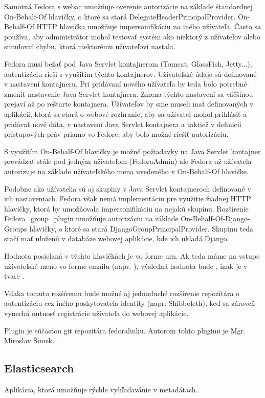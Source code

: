 \documentclass[thesis=M,slovak]{FITthesis}[2013/05/06]
\begin{document}
Samotná Fedora s webac umožňuje overenie autorizácie na základe štandardnej On-Behalf-Of hlavičky, o ktoré sa stará DelegateHeaderPrincipalProvider. On-Behalf-Of HTTP hlavička umožňuje impersonifikáciu na iného užívateľa. Často sa používa, aby administrátor mohol testovať systém ako niektorý z užívateľov alebo simulovať chybu, ktorá niektorému užívateľovi nastala. 

Fedora musí bežať pod Java Servlet kontajnerom (Tomcat, GlassFish, Jetty...), autentizáciu rieši s využitím týchto kontajnerov. Užívateľské údaje sú definované v nastavení kontajneru. Pri pridávaní nového užívateľa by teda bolo potrebné zmeniť nastavenie Java Servlet kontajnera. Zmena týchto nastavení sa väčšinou prejaví až po reštarte kontajnera. Užívateľov by sme museli mať definovaných v aplikácii, ktorá sa stará o webové rozhranie, aby sa užívateľ mohol prihlásiť a pridávať nové dáta, v nastavení Java Servlet kontajnera a taktiež v definicii prístupových práv priamo vo Fedore, aby bolo možné riešiť autorizáciu.

\label{On-Behalf-Of}S využitím On-Behalf-Of hlavičky je možné požiadavky na Java Servlet kontajner prevádzať stále pod jedným užívateľom (FedoraAdmin) ale Fedora už užívateľa autorizuje na základe užívateľského mena uvedeného v On-Behalf-Of hlavičke.

Podobne ako užívatelia sú aj skupiny v Java Servlet kontajneroch definované v ich nastaveniach. Fedora však nemá implementáciu pre využitie žiadnej HTTP hlavičky, ktorá by umožňovala impersonifikáciu na nejakú skupinu. Rozšírenie Fedora\_group\_plugin umožňuje autorizáciu na základe On-Behalf-Of-Django-Groups hlavičky, o ktoré sa stará DjangoGroupPrincipalProvider. Skupinu teda stačí mať uloženú v databáze webovej aplikácie, kde ich ukladá Django.

Hodnota posielaná v týchto hlavičkách je vo forme urn.
Ak teda máme na vstupe užívateľské meno vo forme emailu (napr. ), výsledná hodnota bude , inak je v tvare . 

Vďaka tomuto rozšíreniu bude možné aj jednoduché rozšírenie repozitára o autentizáciu cez iného poskytovateľa identity (napr. Shibboleth), keď sa zároveň vynechá nutnosť registrácie užívateľa do webovej aplikácie.

Plugin je súčasťou git repozitára fedoralinku. Autorom tohto pluginu je Mgr. Miroslav Šimek. 

\subsection{Elasticsearch}
Aplikácia, ktorá umožňuje rýchle vyhľadavánie v metadátach.
\end{document}
